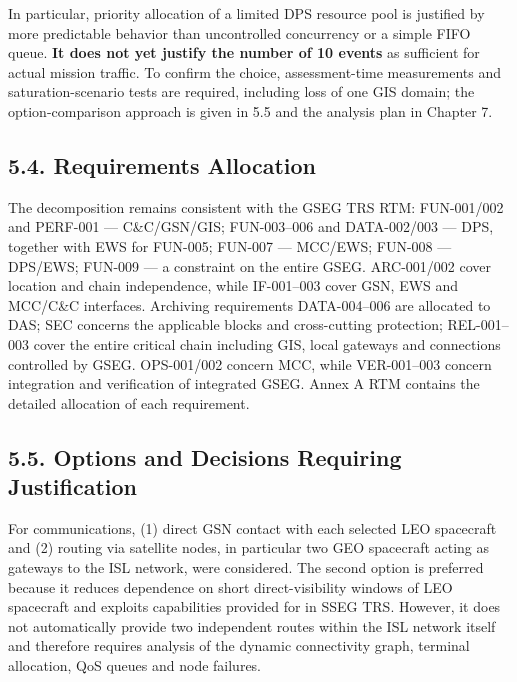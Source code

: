 In particular, priority allocation of a limited DPS resource pool is justified by more predictable behavior than uncontrolled concurrency or a simple FIFO queue. \textbf{It does not yet justify the number of 10 events} as sufficient for actual mission traffic. To confirm the choice, assessment-time measurements and saturation-scenario tests are required, including loss of one GIS domain; the option-comparison approach is given in 5.5 and the analysis plan in Chapter 7.

\subsection{5.4. Requirements Allocation}\label{ddjf-5-4}

The decomposition remains consistent with the GSEG TRS RTM: FUN-001/\allowbreak{}002 and PERF-001 — C\&C/\allowbreak{}GSN/\allowbreak{}GIS; FUN-003–006 and DATA-002/\allowbreak{}003 — DPS, together with EWS for FUN-005; FUN-007 — MCC/\allowbreak{}EWS; FUN-008 — DPS/\allowbreak{}EWS; FUN-009 — a constraint on the entire GSEG. ARC-001/\allowbreak{}002 cover location and chain independence, while IF-001–003 cover GSN, EWS and MCC/\allowbreak{}C\&C interfaces. Archiving requirements DATA-004–006 are allocated to DAS; SEC concerns the applicable blocks and cross-cutting protection; REL-001–003 cover the entire critical chain including GIS, local gateways and connections controlled by GSEG. OPS-001/\allowbreak{}002 concern MCC, while VER-001–003 concern integration and verification of integrated GSEG. Annex A RTM contains the detailed allocation of each requirement.

\subsection{5.5. Options and Decisions Requiring Justification}\label{ddjf-5-5}

For communications, (1) direct GSN contact with each selected LEO spacecraft and (2) routing via satellite nodes, in particular two GEO spacecraft acting as gateways to the ISL network, were considered. The second option is preferred because it reduces dependence on short direct-visibility windows of LEO spacecraft and exploits capabilities provided for in SSEG TRS. However, it does not automatically provide two independent routes within the ISL network itself and therefore requires analysis of the dynamic connectivity graph, terminal allocation, QoS queues and node failures.

